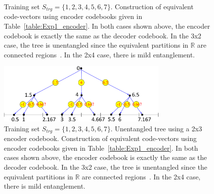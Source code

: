 							\begin{figure}
							\centering
							\caption{Training set $S_{trg}=\{1,2,3,4,5,6,7\}$.  Construction of equivalent code-vectors using encoder codebooks given in Table~\ref{table:Exp1_encoder}.  In both cases shown above, the encoder codebook is exactly the same as the decoder codebook.  In the 3x2 case, the tree is unentangled since the equivalent partitions in $\mathbb{R}$ are connected regions~\cite{1992_JNL_RVQ_Barnes}.  In the 2x4 case, there is mild entanglement.}
							\label{fig:RVQ_entanglement_tree}
							\end{figure}

							\begin{figure}
							\centering
							\includegraphics[width=0.75\textwidth]{thesis2/RVQ_trg_1_to_7_equivalentCVs_3.pdf}
							\caption{Training set $S_{trg}=\{1,2,3,4,5,6,7\}$.  Unentangled tree using a 2x3 encoder codebook.  Construction of equivalent code-vectors using encoder codebooks given in Table~\ref{table:Exp1_encoder}.  In both cases shown above, the encoder codebook is exactly the same as the decoder codebook.  In the 3x2 case, the tree is unentangled since the equivalent partitions in $\mathbb{R}$ are connected regions~\cite{1992_JNL_RVQ_Barnes}.  In the 2x4 case, there is mild entanglement.}
							\label{fig:RVQ_entanglement_tree}
							\end{figure}

